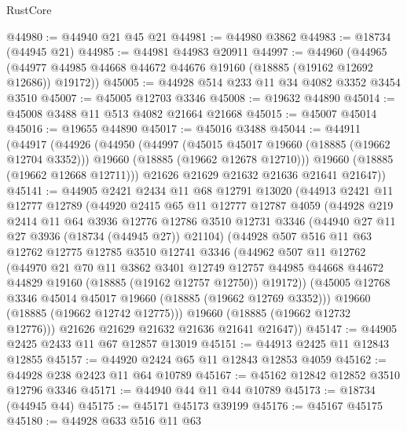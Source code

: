 \begin{lexlean}{RustCore}
\begin{coremodule}
@44980 := @44940 @21 @45 @21
@44981 := @44980 @3862
@44983 := @18734 (@44945 @21)
@44985 := @44981 @44983 @20911
@44997 := @44960
    (@44965 (@44977 @44985 @44668 @44672 @44676 @19160 (@18885 (@19162 @12692 @12686)) @19172))
@45005 := @44928 @514 @233 @11 @34 @4082 @3352 @3454 @3510
@45007 := @45005 @12703 @3346
@45008 := @19632 @44890
@45014 := @45008 @3488 @11 @513 @4082 @21664 @21668
@45015 := @45007 @45014
@45016 := @19655 @44890
@45017 := @45016 @3488
@45044 := @44911
    (@44917
      (@44926
        (@44950
          (@44997
            (@45015 @45017 @19660 (@18885 (@19662 @12704 @3352)))
            @19660
            (@18885 (@19662 @12678 @12710)))
          @19660
          (@18885 (@19662 @12668 @12711)))
        @21626
        @21629
        @21632
        @21636
        @21641
        @21647))
@45141 := @44905
    @2421
    @2434
    @11
    @68
    @12791
    @13020
    (@44913
      @2421
      @11
      @12777
      @12789
      (@44920
        @2415
        @65
        @11
        @12777
        @12787
        @4059
        (@44928
          @219
          @2414
          @11
          @64
          @3936
          @12776
          @12786
          @3510
          @12731
          @3346
          (@44940 @27 @11 @27 @3936 (@18734 (@44945 @27)) @21104)
          (@44928
            @507
            @516
            @11
            @63
            @12762
            @12775
            @12785
            @3510
            @12741
            @3346
            (@44962
              @507
              @11
              @12762
              (@44970
                @21
                @70
                @11
                @3862
                @3401
                @12749
                @12757
                @44985
                @44668
                @44672
                @44829
                @19160
                (@18885 (@19162 @12757 @12750))
                @19172))
            (@45005 @12768 @3346 @45014 @45017 @19660 (@18885 (@19662 @12769 @3352)))
            @19660
            (@18885 (@19662 @12742 @12775)))
          @19660
          (@18885 (@19662 @12732 @12776)))
        @21626
        @21629
        @21632
        @21636
        @21641
        @21647))
@45147 := @44905 @2425 @2433 @11 @67 @12857 @13019
@45151 := @44913 @2425 @11 @12843 @12855
@45157 := @44920 @2424 @65 @11 @12843 @12853 @4059
@45162 := @44928 @238 @2423 @11 @64 @10789
@45167 := @45162 @12842 @12852 @3510 @12796 @3346
@45171 := @44940 @44 @11 @44 @10789
@45173 := @18734 (@44945 @44)
@45175 := @45171 @45173 @39199
@45176 := @45167 @45175
@45180 := @44928 @633 @516 @11 @63

\end{coremodule}
\end{lexlean}
